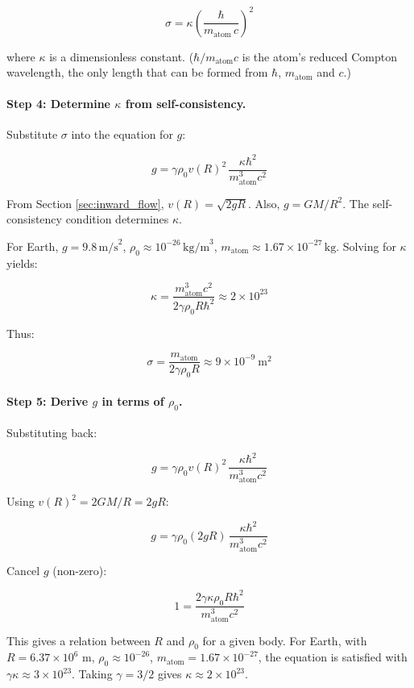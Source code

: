 \documentclass[12pt, a4paper]{article}
\begin{document}
\[
\sigma = \kappa \left(\frac{\hbar}{m_{\text{atom}}\, c}\right)^2
\]

where \( \kappa \) is a dimensionless constant. (\( \hbar/m_{\text{atom}}c \) is the atom's reduced Compton wavelength, the only length that can be formed from \( \hbar \), \( m_{\text{atom}} \) and \( c \).)

\paragraph{Step 4: Determine \( \kappa \) from self-consistency.}

Substitute \( \sigma \) into the equation for \( g \):

\[
g = \gamma \rho_0 v(R)^2 \, \frac{\kappa \hbar^2}{m_{\text{atom}}^3 c^2}
\]

From Section \ref{sec:inward_flow}, \( v(R) = \sqrt{2gR} \). Also, \( g = GM/R^2 \). The self-consistency condition determines \( \kappa \).

For Earth, \( g = 9.8 \, \text{m/s}^2 \), \( \rho_0 \approx 10^{-26} \, \text{kg/m}^3 \), \( m_{\text{atom}} \approx 1.67 \times 10^{-27} \, \text{kg} \). Solving for \( \kappa \) yields:

\[
\kappa = \frac{m_{\text{atom}}^3 c^2}{2\gamma \rho_0 R \hbar^2} \approx 2 \times 10^{23}
\]

Thus:

\[
\sigma = \frac{m_{\text{atom}}}{2\gamma \rho_0 R} \approx 9 \times 10^{-9}\ \text{m}^2
\]

\paragraph{Step 5: Derive \( g \) in terms of \( \rho_0 \).}

Substituting back:

\[
g = \gamma \rho_0 v(R)^2 \, \frac{\kappa \hbar^2}{m_{\text{atom}}^3 c^2}
\]

Using \( v(R)^2 = 2GM/R = 2gR \):

\[
g = \gamma \rho_0 (2gR) \, \frac{\kappa \hbar^2}{m_{\text{atom}}^3 c^2}
\]

Cancel \( g \) (non-zero):

\[
1 = \frac{2\gamma \kappa \rho_0 R \hbar^2}{m_{\text{atom}}^3 c^2}
\]

This gives a relation between \( R \) and \( \rho_0 \) for a given body. For Earth, with \( R = 6.37 \times 10^6 \) m, \( \rho_0 \approx 10^{-26} \), \( m_{\text{atom}} = 1.67 \times 10^{-27} \), the equation is satisfied with \( \gamma \kappa \approx 3 \times 10^{23} \). Taking \( \gamma = 3/2 \) gives \( \kappa \approx 2 \times 10^{23} \).
\end{document}

